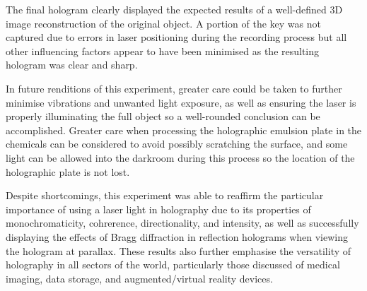 \documentclass[12pt]{article}
\begin{document}
The final hologram clearly displayed the expected results of a well-defined 3D image reconstruction of the original object. A portion of the key was not captured due to errors in laser positioning during the recording process but all other
influencing factors appear to have been minimised as the resulting hologram was clear and sharp.

In future renditions of this experiment, greater care could be taken to further minimise vibrations and unwanted light exposure, as well as ensuring the laser is properly illuminating the full object so a well-rounded conclusion can be accomplished.
Greater care when processing the holographic emulsion plate in the chemicals can be considered to avoid possibly scratching the surface, and some light can be allowed into the darkroom during this process so the location of the holographic plate is not lost.

Despite shortcomings, this experiment was able to reaffirm the particular importance of using a laser light in holography due to its properties of monochromaticity, cohrerence, directionality, and intensity, as well as successfully displaying the effects of Bragg diffraction in
reflection holograms when viewing the hologram at parallax. These results also further emphasise the versatility of holography in all sectors of the world, particularly those discussed of medical imaging, data storage, and augmented/virtual reality devices.

\newpage



 \label{sec:ref}

\vspace{1.5cm}

\listoffigures
\end{document}
